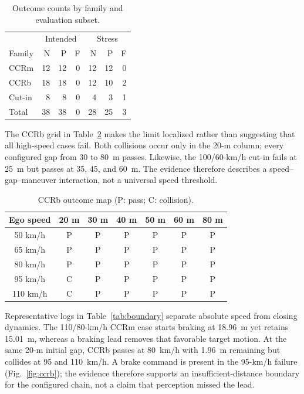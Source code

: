 \documentclass[conference]{IEEEtran}
\begin{document}
\begin{table}[t]
\caption{Outcome counts by family and evaluation subset.}
\label{tab:results}
\centering
\footnotesize
\begin{tabular}{lrrr|rrr}
\toprule
& \multicolumn{3}{c|}{Intended} & \multicolumn{3}{c}{Stress} \\
Family & N & P & F & N & P & F \\
\midrule
CCRm & 12 & 12 & 0 & 12 & 12 & 0 \\
CCRb & 18 & 18 & 0 & 12 & 10 & 2 \\
Cut-in & 8 & 8 & 0 & 4 & 3 & 1 \\
\midrule
Total & 38 & 38 & 0 & 28 & 25 & 3 \\
\bottomrule
\end{tabular}
\end{table}

The CCRb grid in Table~\ref{tab:ccrbmap} makes the limit localized rather than
suggesting that all high-speed cases fail. Both collisions occur only in the
20-m column; every configured gap from 30 to 80~m passes. Likewise, the
100/60-km/h cut-in fails at 25~m but passes at 35, 45, and 60~m. The evidence
therefore describes a speed--gap--maneuver interaction, not a universal speed
threshold.

\begin{table}[t]
\caption{CCRb outcome map (P: pass; C: collision).}
\label{tab:ccrbmap}
\centering
\scriptsize
\begin{tabular}{c*{6}{c}}
\toprule
Ego speed & 20 m & 30 m & 40 m & 50 m & 60 m & 80 m \\
\midrule
50 km/h  & P & P & P & P & P & P \\
65 km/h  & P & P & P & P & P & P \\
80 km/h  & P & P & P & P & P & P \\
95 km/h  & C & P & P & P & P & P \\
110 km/h & C & P & P & P & P & P \\
\bottomrule
\end{tabular}
\end{table}

Representative logs in Table~\ref{tab:boundary} separate absolute speed from
closing dynamics. The 110/80-km/h CCRm case starts braking at 18.96~m yet retains
15.01~m, whereas a braking lead removes that favorable target motion. At the
same 20-m initial gap, CCRb passes at 80~km/h with 1.96~m remaining but collides
at 95 and 110~km/h. A brake command is present in the 95-km/h failure
(Fig.~\ref{fig:ccrb}); the evidence therefore supports an insufficient-distance
boundary for the configured chain, not a claim that perception missed the lead.
\end{document}
